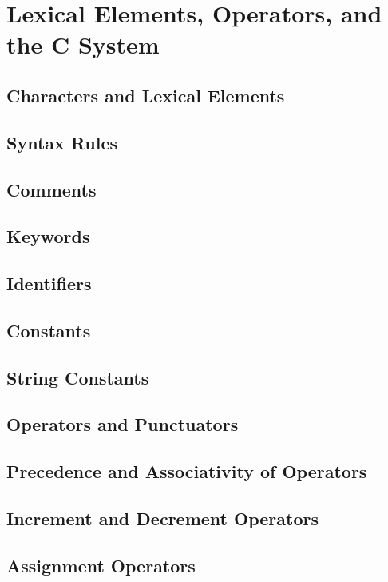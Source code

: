 \documentclass{article}
\begin{document}
\chapter{Lexical Elements, Operators, and the C System}

\section{Characters and Lexical Elements} \label{sec:characters_lexical_elements}
\section{Syntax Rules} \label{sec:syntax_rules}
\section{Comments} \label{sec:comments}
\section{Keywords} \label{sec:keywords}
\section{Identifiers} \label{sec:identifiers}
\section{Constants} \label{sec:constants}
\section{String Constants} \label{sec:string_constants}
\section{Operators and Punctuators} \label{sec:operators_punctuators}
\section{Precedence and Associativity of Operators} \label{sec:precedence_associativity}
\section{Increment and Decrement Operators} \label{sec:increment_decrement_operators}
\section{Assignment Operators} \label{sec:assignment_operators}
\end{document}
